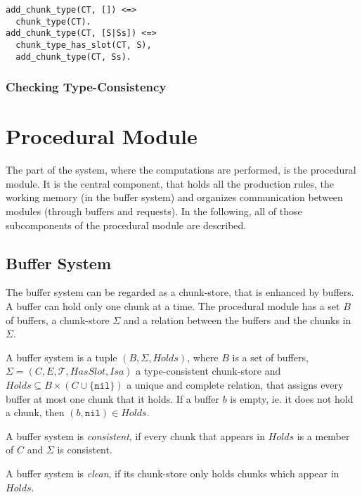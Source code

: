 \begin{lstlisting}[caption={rules for \texttt{add\_chunk\_type}}]
add_chunk_type(CT, []) <=> 
  chunk_type(CT).
add_chunk_type(CT, [S|Ss]) <=> 
  chunk_type_has_slot(CT, S), 
  add_chunk_type(CT, Ss).
\end{lstlisting}





\subsubsection{Checking Type-Consistency}


\section{Procedural Module}

The part of the system, where the computations are performed, is the procedural module. It is the central component, that holds all the production rules, the working memory (in the buffer system) and organizes communication between modules (through buffers and requests). In the following, all of those subcomponents of the procedural module are described.

\subsection{Buffer System}

The buffer system can be regarded as a chunk-store, that is enhanced by buffers. A buffer can hold only one chunk at a time. The procedural module has a set $B$ of buffers, a chunk-store $\Sigma$ and a relation between the buffers and the chunks in $\Sigma$.

\begin{definition}
\label{def:buffer_system}
A buffer system is a tuple $(B,\Sigma,Holds)$, where $B$ is a set of buffers, $\Sigma = (C, E, \mathcal{T}, HasSlot, Isa)$ a type-consistent chunk-store and $Holds \subseteq B \times (C \cup \{ \mathtt{nil} \})$ a unique and complete relation, that assigns every buffer at most one chunk that it holds. If a buffer $b$ is empty, ie. it does not hold a chunk, then $(b,\mathtt{nil}) \in Holds$.

A buffer system is \emph{consistent}, if every chunk that appears in $Holds$ is a member of $C$ and $\Sigma$ is consistent.

A buffer system is \emph{clean}, if its chunk-store only holds chunks which appear in $Holds$.
\end{definition}

